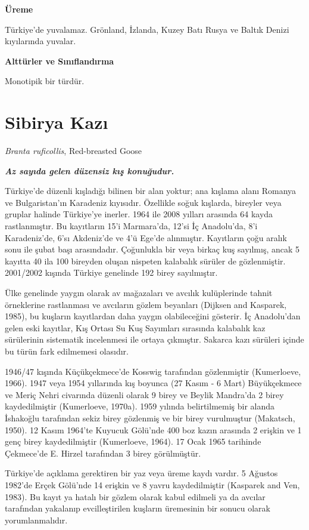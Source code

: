 \documentclass[
  a4paper,
  DIV=11,
  numbers=noendperiod]{scrartcl}
\begin{document}
\textbf{Üreme}

Türkiye'de yuvalamaz. Grönland, İzlanda, Kuzey Batı Rusya ve Baltık
Denizi kıyılarında yuvalar.

\textbf{Alttürler ve Sınıflandırma}

Monotipik bir türdür.

\section{Sibirya Kazı}\label{sibirya-kazux131}

\emph{Branta ruficollis}, Red-breasted Goose

\textbf{\emph{Az sayıda gelen düzensiz kış konuğudur.}}

Türkiye'de düzenli kışladığı bilinen bir alan yoktur; ana kışlama alanı
Romanya ve Bulgaristan'ın Karadeniz kıyısıdır. Özellikle soğuk kışlarda,
bireyler veya gruplar halinde Türkiye'ye inerler. 1964 ile 2008 yılları
arasında 64 kayda rastlanmıştır. Bu kayıtların 15'i Marmara'da, 12'si İç
Anadolu'da, 8'i Karadeniz'de, 6'sı Akdeniz'de ve 4'ü Ege'de alınmıştır.
Kayıtların çoğu aralık sonu ile şubat başı arasındadır. Çoğunlukla bir
veya birkaç kuş sayılmış, ancak 5 kayıtta 40 ila 100 bireyden oluşan
nispeten kalabalık sürüler de gözlenmiştir. 2001/2002 kışında Türkiye
genelinde 192 birey sayılmıştır.

Ülke genelinde yaygın olarak av mağazaları ve avcılık kulüplerinde
tahnit örneklerine rastlanması ve avcıların gözlem beyanları (Dijksen
and Kasparek, 1985), bu kuşların kayıtlardan daha yaygın olabileceğini
gösterir. İç Anadolu'dan gelen eski kayıtlar, Kış Ortası Su Kuş
Sayımları sırasında kalabalık kaz sürülerinin sistematik incelenmesi ile
ortaya çıkmıştır. Sakarca kazı sürüleri içinde bu türün fark edilmemesi
olasıdır.

1946/47 kışında Küçükçekmece'de Kosswig tarafından gözlenmiştir
(Kumerloeve, 1966). 1947 veya 1954 yıllarında kış boyunca (27 Kasım - 6
Mart) Büyükçekmece ve Meriç Nehri civarında düzenli olarak 9 birey ve
Beylik Mandra'da 2 birey kaydedilmiştir (Kumerloeve, 1970a). 1959
yılında belirtilmemiş bir alanda İshakoğlu tarafından sekiz birey
gözlenmiş ve bir birey vurulmuştur (Makatsch, 1950). 12 Kasım 1964'te
Kuyucuk Gölü'nde 400 boz kazın arasında 2 erişkin ve 1 genç birey
kaydedilmiştir (Kumerloeve, 1964). 17 Ocak 1965 tarihinde Çekmece'de E.
Hirzel tarafından 3 birey görülmüştür.

Türkiye'de açıklama gerektiren bir yaz veya üreme kaydı vardır. 5
Ağustos 1982'de Erçek Gölü'nde 14 erişkin ve 8 yavru kaydedilmiştir
(Kasparek and Ven, 1983). Bu kayıt ya hatalı bir gözlem olarak kabul
edilmeli ya da avcılar tarafından yakalanıp evcilleştirilen kuşların
üremesinin bir sonucu olarak yorumlanmalıdır.
\end{document}
